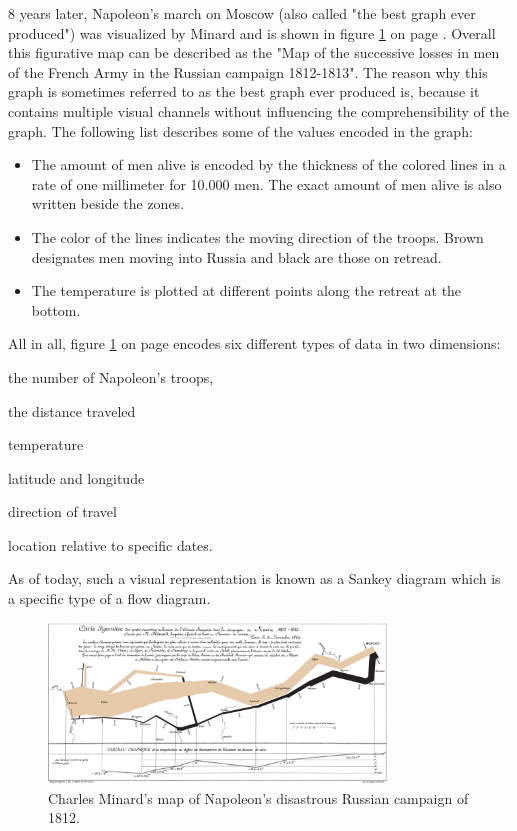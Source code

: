8 years later, Napoleon's march on Moscow (also called "the best graph ever produced") was visualized by Minard and is shown in figure \ref{fig:minard2} on page \pageref{fig:minard2}. Overall this figurative map can be described as the "Map of the successive losses in men of the French Army in the Russian campaign 1812-1813". The reason why this graph is sometimes referred to as the best graph ever produced is, because it contains multiple visual channels without influencing the comprehensibility of the graph. The following list describes some of the values encoded in the graph:
\begin{itemize}
\item The amount of men alive is encoded by the thickness of the colored lines in a rate of one millimeter for 10.000 men. The exact amount of men alive is also written beside the zones.
\item The color of the lines indicates the moving direction of the troops. Brown designates men moving into Russia and black are those on retread.
\item The temperature is plotted at different points along the retreat at the bottom.
\end{itemize}
All in all, figure \ref{fig:minard2} on page \pageref{fig:minard2} encodes six different types of data in two dimensions:
\begin{enumerate*}
\item the number of Napoleon's troops,
\item the distance traveled
\item temperature
\item latitude and longitude
\item direction of travel
\item location relative to specific dates.
\end{enumerate*}
As of today, such a visual representation is known as a Sankey diagram which is a specific type of a flow diagram.

\begin{figure}[h]
\centering
\includegraphics[width=0.8\textwidth,keepaspectratio]{images/history/minard2.png}
\caption[
    Charles Minard's map of Napoleon's disastrous Russian campaign of 1812., Urldate: 07.2016 \newline
\small\texttt{\url{https://upload.wikimedia.org/wikipedia/commons/2/29/Minard.png}}
]{Charles Minard's map of Napoleon's disastrous Russian campaign of 1812.}
\label{fig:minard2}
\end{figure}

